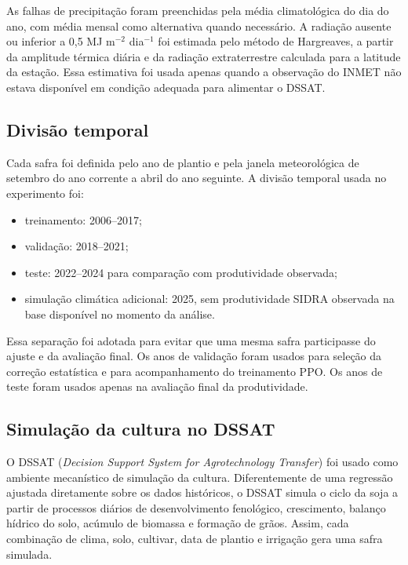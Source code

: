 As falhas de precipitação foram preenchidas pela média climatológica do dia do
ano, com média mensal como alternativa quando necessário. A radiação ausente ou
inferior a 0,5 MJ m$^{-2}$ dia$^{-1}$ foi estimada pelo método de Hargreaves, a
partir da amplitude térmica diária e da radiação extraterrestre calculada para a
latitude da estação. Essa estimativa foi usada apenas quando a observação do
INMET não estava disponível em condição adequada para alimentar o DSSAT.

\subsection{Divisão temporal}
\label{subsec:divisao_temporal}

Cada safra foi definida pelo ano de plantio e pela janela meteorológica de
setembro do ano corrente a abril do ano seguinte. A divisão temporal usada no
experimento foi:
\begin{itemize}
    \item treinamento: 2006--2017;
    \item validação: 2018--2021;
    \item teste: 2022--2024 para comparação com produtividade observada;
    \item simulação climática adicional: 2025, sem produtividade SIDRA observada
    na base disponível no momento da análise.
\end{itemize}

Essa separação foi adotada para evitar que uma mesma safra participasse do
ajuste e da avaliação final. Os anos de validação foram usados para seleção da
correção estatística e para acompanhamento do treinamento PPO. Os anos de teste
foram usados apenas na avaliação final da produtividade.

\subsection{Simulação da cultura no DSSAT}
\label{subsec:dssat}

O DSSAT (\textit{Decision Support System for Agrotechnology Transfer}) foi usado
como ambiente mecanístico de simulação da cultura. Diferentemente de uma
regressão ajustada diretamente sobre os dados históricos, o DSSAT simula o ciclo
da soja a partir de processos diários de desenvolvimento fenológico, crescimento,
balanço hídrico do solo, acúmulo de biomassa e formação de grãos. Assim, cada
combinação de clima, solo, cultivar, data de plantio e irrigação gera uma safra
simulada.

